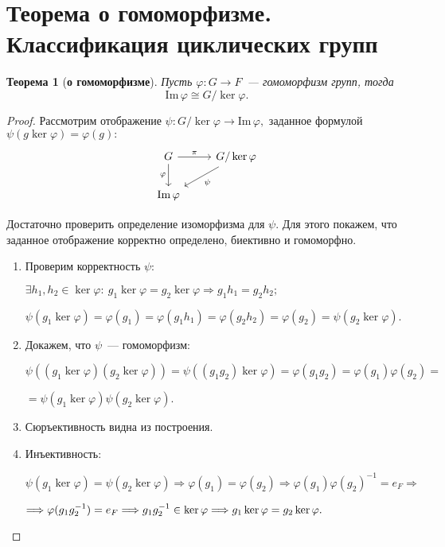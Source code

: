 \documentclass[a4paper, 14pt]{extarticle}
\newcommand{\n}{\par}
\newcommand{\suchthat}{{:}{ } \ }
\newcommand{\im}{\mathrm{Im} \,}
\renewcommand{\phi}{\varphi}
\theoremstyle{definition}
\theoremstyle{plain}
\newtheorem*{theorem*}{Теорема}
\numberwithin{theorem}{section}
\numberwithin{definition}{section}
\numberwithin{statement}{section}
\numberwithin{lemma}{section}
\numberwithin{consequence}{section}
\begin{document}
	\section{Теорема о гомоморфизме. Классификация циклических групп}
	\begin{theorem*}[\textbf{о гомоморфизме}]
		Пусть ${\phi: G \rightarrow F}$~--- гомоморфизм групп, тогда
		\begin{equation*}
			\im \phi \cong G/ \ker \phi.
		\end{equation*}
	\end{theorem*}
	\begin{proof}
		Рассмотрим отображение ${\psi: G/ \ker \phi \rightarrow \im \phi,}$ заданное формулой ${\psi(g \ker \phi) = \phi(g){:}}$ 
        \[
          \begin{tikzcd}
            G \arrow{r}{\pi} \arrow[swap]{d}{\phi} & G/\ker \phi \arrow{ld}{\psi} \\
             \im\phi
          \end{tikzcd}
        \]\n
		Достаточно проверить определение изоморфизма для $\psi.$ Для этого покажем, что заданное отображение корректно определено, биективно и гомоморфно.
		\begin{enumerate}
			\setlength\itemsep{0.1em}
			\item Проверим корректность $\psi{:}$ \n
			$\exists h_1, h_2 \in \ker \phi \suchthat g_1 \ker \phi = g_2 \ker \phi \Longrightarrow g_1 h_1 = g_2 h_2;$ \n
			$\psi(g_1 \ker \phi) = \phi(g_1) = \phi(g_1 h_1) = \phi(g_2 h_2) = \phi(g_2) = \psi(g_2 \ker \phi).$
			\item Докажем, что $\psi$~--- гомоморфизм: \n
			${\psi((g_1 \ker \phi)(g_2 \ker \phi)) = \psi ((g_1g_2) \ker \phi) = \phi(g_1 g_2) = \phi(g_1) \phi(g_2) =}$ \n
			${=\psi(g_1 \ker \phi) \psi(g_2 \ker \phi).}$
			\item Сюръективность видна из построения.
			\item Инъективность: \n
			${\psi(g_1 \ker \phi) = \psi(g_2 \ker \phi) \Longrightarrow \phi(g_1) = \phi(g_2) \Longrightarrow \phi(g_1) \phi(g_2)^{-1} = e_F \Longrightarrow}$ \n $\Longrightarrow \phi(g_1g_2^{-1}) = e_F \Longrightarrow g_1g_2^{-1} \in \ker \phi \Longrightarrow g_1 \ker \phi = g_2 \ker \phi. \qedhere$
		\end{enumerate} 
	\end{proof}
        \newpage
\end{document}
